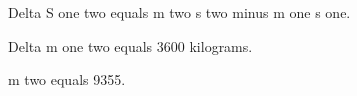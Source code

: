 Delta S one two equals m two s two minus m one s one.  

Delta m one two equals 3600 kilograms.  

m two equals 9355.